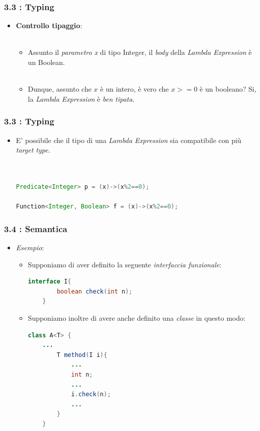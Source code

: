 \documentclass{beamer}
\begin{document}

\begin{frame}[fragile]
	\frametitle{\textbf{3.3 : Typing}}
	\begin{itemize}
		\item
			\textbf{Controllo tipaggio}:\\\
			\begin{itemize}
				\item 
					Assunto il \textit{parametro x} di tipo Integer, il \textit{body} della \textit{Lambda Expression} è un Boolean.\\\
				\item 
					Dunque, assunto che $x$ è un intero, è vero che $x>=0$ è un booleano? Si, la \textit{Lambda Expression} è \textit{ben tipata}.
			\end{itemize}
	\end{itemize}
\end{frame}


\begin{frame}[fragile]
	\frametitle{\textbf{3.3 : Typing}}
	\begin{itemize}
		\item
			E' possibile che il tipo di una \textit{Lambda Expression} sia compatibile con più \textit{target type}.\\\
\begin{lstlisting}[language=Java]

Predicate<Integer> p = (x)->(x%2==0);

Function<Integer, Boolean> f = (x)->(x%2==0);

\end{lstlisting}
	\end{itemize}
\end{frame}


\begin{frame}[fragile]
	\frametitle{\textbf{3.4 : Semantica}}
	\begin{itemize}
		\item
			\textit{Esempio}: 
			\begin{itemize}
				\item
					Supponiamo di aver definito la seguente \textit{interfaccia funzionale}:
\begin{lstlisting}[language=Java]
	interface I{
		boolean check(int n);
	}
\end{lstlisting}
				\item
					Supponiamo inoltre di avere anche definito una \textit{classe} in questo modo:
\begin{lstlisting}[language=Java]
	class A<T> {
	...
		T method(I i){
			...
			int n;
			...
			i.check(n);
			...
		}
	}
\end{lstlisting}
			\end{itemize}
	\end{itemize}
\end{frame}
\end{document}
